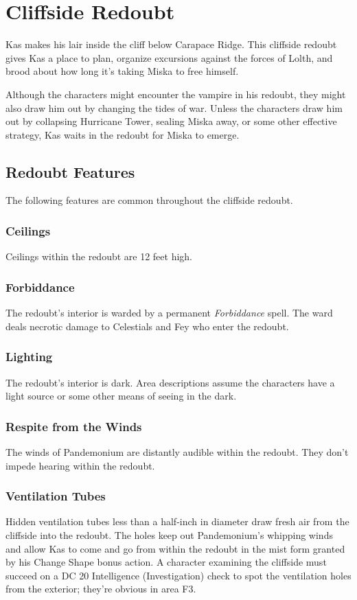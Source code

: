 \documentclass[10pt,a4paper,twoside,bg=print,twocolumn,openany,nodeprecatedcode]{dndbook}
\begin{document}
\section{Cliffside Redoubt}
Kas makes his lair inside the cliff below Carapace Ridge. This cliffside redoubt gives Kas a place to plan, organize excursions against the forces of Lolth, and brood about how long it's taking Miska to free himself.

Although the characters might encounter the vampire in his redoubt, they might also draw him out by changing the tides of war. Unless the characters draw him out by collapsing Hurricane Tower, sealing Miska away, or some other effective strategy, Kas waits in the redoubt for Miska to emerge.

\subsection{Redoubt Features}
The following features are common throughout the cliffside redoubt.

\subsubsection{Ceilings}
Ceilings within the redoubt are 12 feet high.

\subsubsection{Forbiddance}
The redoubt's interior is warded by a permanent \textit{Forbiddance} spell. The ward deals necrotic damage to Celestials and Fey who enter the redoubt.

\subsubsection{Lighting}
The redoubt's interior is dark. Area descriptions assume the characters have a light source or some other means of seeing in the dark.

\subsubsection{Respite from the Winds}
The winds of Pandemonium are distantly audible within the redoubt. They don't impede hearing within the redoubt.

\subsubsection{Ventilation Tubes}
Hidden ventilation tubes less than a half-inch in diameter draw fresh air from the cliffside into the redoubt. The holes keep out Pandemonium's whipping winds and allow Kas to come and go from within the redoubt in the mist form granted by his Change Shape bonus action. A character examining the cliffside must succeed on a DC 20 Intelligence (Investigation) check to spot the ventilation holes from the exterior; they're obvious in area F3.
\end{document}
